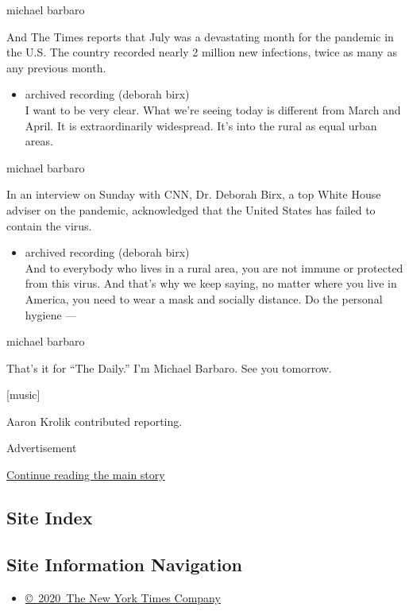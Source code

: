 michael barbaro

And The Times reports that July was a devastating month for the pandemic
in the U.S. The country recorded nearly 2 million new infections, twice
as many as any previous month.

\begin{itemize}
\tightlist
\item
  archived recording (deborah birx)\\
  I want to be very clear. What we're seeing today is different from
  March and April. It is extraordinarily widespread. It's into the rural
  as equal urban areas.
\end{itemize}

michael barbaro

In an interview on Sunday with CNN, Dr. Deborah Birx, a top White House
adviser on the pandemic, acknowledged that the United States has failed
to contain the virus.

\begin{itemize}
\tightlist
\item
  archived recording (deborah birx)\\
  And to everybody who lives in a rural area, you are not immune or
  protected from this virus. And that's why we keep saying, no matter
  where you live in America, you need to wear a mask and socially
  distance. Do the personal hygiene ---
\end{itemize}

michael barbaro

That's it for ``The Daily.'' I'm Michael Barbaro. See you tomorrow.

{[}music{]}

Aaron Krolik contributed reporting.

Advertisement

\protect\hyperlink{after-bottom}{Continue reading the main story}

\hypertarget{site-index}{%
\subsection{Site Index}\label{site-index}}

\hypertarget{site-information-navigation}{%
\subsection{Site Information
Navigation}\label{site-information-navigation}}

\begin{itemize}
\tightlist
\item
  \href{https://help.nytimes.com/hc/en-us/articles/115014792127-Copyright-notice}{©~2020~The
  New York Times Company}
\end{itemize}

